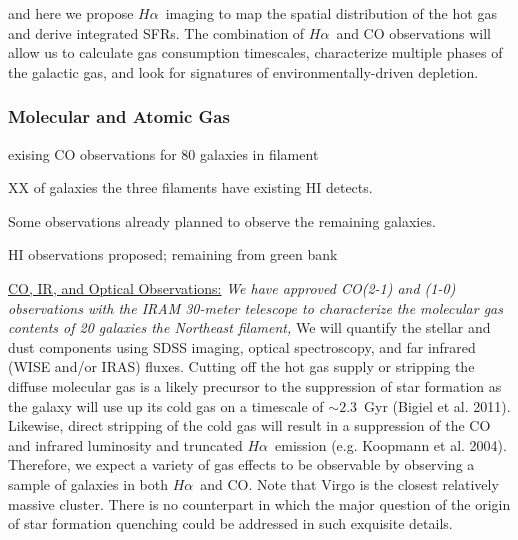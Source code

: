 \documentclass[12pt, preprint]{aastex}
\newcommand{\ha}{$H\alpha$}
\begin{document}
and here we propose \ha \ imaging to map the
  spatial distribution of the hot gas and derive integrated SFRs.  The
combination of \ha \ and CO observations will allow us to calculate
gas consumption timescales, characterize multiple phases of the
galactic gas, and look for signatures of environmentally-driven
depletion.
\subsubsection{Molecular and Atomic Gas}
exising CO observations for 80 galaxies in filament

XX of galaxies the three filaments have existing HI detects.

Some observations already planned to observe the remaining galaxies.

HI observations proposed; remaining from green bank

\underline{CO, IR, and Optical Observations:}  {\it We have approved
  CO(2-1) and (1-0) observations with the IRAM 30-meter telescope to
  characterize the molecular gas contents of 20 galaxies the Northeast filament, }
We will quantify the stellar and dust components using
SDSS imaging, optical spectroscopy, and
far infrared (WISE and/or IRAS) fluxes.  Cutting off the hot gas supply or stripping the diffuse molecular gas
is a likely precursor to the suppression of star formation as the
galaxy will use up its cold gas on a timescale of $\sim 2.3$~Gyr
(Bigiel et al. 2011).  Likewise, direct stripping of the cold gas will
result in a suppression of the CO and infrared luminosity and
truncated \ha \ emission (e.g. Koopmann et al. 2004).  Therefore,
we expect a variety of gas effects to be observable by observing a
sample of galaxies in both \ha \ and CO.
Note that Virgo is the closest relatively massive cluster. There is no counterpart
in which the major question of the origin of star formation quenching could be
addressed in such exquisite details.
\end{document}
